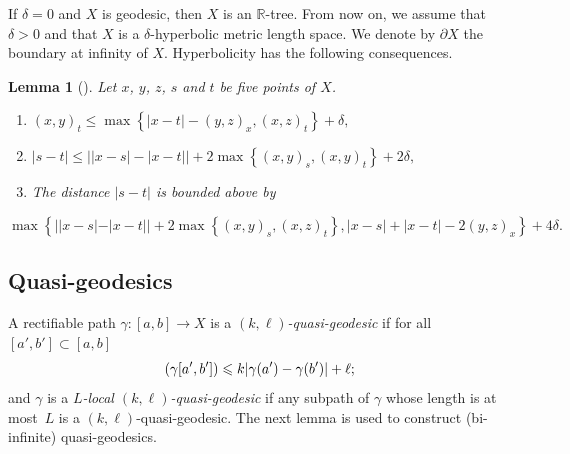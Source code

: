 \documentclass[11pt]{article}
\newcommand{\NoChangel}[1]{%
\expandafter\let\csname old\string#1\endcsname=#1
\let#1=\relax
\newcommand{#1}{\mathcode`l="716C\csname old\string#1\endcsname\mathcode`l="7160 }%
}
\theoremstyle{plain}
\newtheorem{lem}[thm]{Lemma}
\theoremstyle{definition}
\DeclareMathOperator{\length}{length}\NoChangel{\length}
\begin{document}
If $\delta=0$ and $X$ is geodesic, then $X$ is an $\mathbb{R}$-tree.
From now on, we assume that $\delta>0$ and that $X$ is a $\delta$-hyperbolic metric length space.
We denote by $\partial X$ the boundary at infinity of $X$.
Hyperbolicity has the following consequences.
\begin{lem}[{\cite[Lem.\,2.2]{coulon_geometry_2014}}]
\label{res: metric inequalities}
Let $x$, $y$, $z$, $s$ and $t$ be five points of $X$.
\begin{enumerate}
\item \label{enu: metric inequalities - thin triangle}
\begin{math}
(x,y)_t \leq \max \left\{ |x - t| - (y,z)_x , (x,z)_t \right\} + \delta,
\end{math}
\item \label{enu: metric inequalities - two points close to a geodesic}
\begin{math}
|s-t| \leq \left| |x-s| - |x-t| \right| + 2\max\left\{ (x,y)_s, (x,y)_t\right\} + 2\delta,
\end{math}
\item \label{enu: metric inequalities - comparison tripod} The distance $|s-t|$ is bounded above by
\end{enumerate}
\begin{displaymath}
\max\left\{| |x-s| - |x-t|| + 2\max \left\{ (x,y)_s,(x,z)_t\right\}, |x-s| + |x-t| - 2 (y,z)_x \right\} + 4\delta.
\end{displaymath}
\end{lem}

\subsection{Quasi-geodesics}
\label{sec: quasi-geodesics}
A rectifiable path $\gamma:[a,b]\to X$ is a \emph{$(k,\ell)$-quasi-geodesic} if for all $[a',b']\subset [a,b]$
\[
\length(\gamma[a',b'])\leqslant k |\gamma(a')-\gamma(b')|+\ell;
\]
and $\gamma$ is a \emph{$L$-local $(k,\ell)$-quasi-geodesic} if any subpath of $\gamma$ whose length is at most~$L$ is a $(k,\ell)$-quasi-geodesic.
The next lemma is used to construct (bi-infinite) quasi-geodesics.
\end{document}
